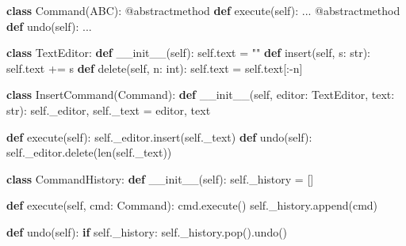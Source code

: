 \documentclass[11pt]{article}
\newenvironment{Shaded}{\begin{snugshade}}{\end{snugshade}}
\newcommand{\AttributeTok}[1]{\textcolor[rgb]{0.16,0.50,0.73}{#1}}
\newcommand{\BuiltInTok}[1]{\textcolor[rgb]{0.50,0.55,0.55}{#1}}
\newcommand{\ControlFlowTok}[1]{\textcolor[rgb]{0.99,0.74,0.29}{\textbf{#1}}}
\newcommand{\FunctionTok}[1]{\textcolor[rgb]{0.56,0.27,0.68}{#1}}
\newcommand{\KeywordTok}[1]{\textcolor[rgb]{0.81,0.81,0.76}{\textbf{#1}}}
\newcommand{\NormalTok}[1]{\textcolor[rgb]{0.81,0.81,0.76}{#1}}
\newcommand{\OperatorTok}[1]{\textcolor[rgb]{0.81,0.81,0.76}{#1}}
\newcommand{\StringTok}[1]{\textcolor[rgb]{0.96,0.31,0.31}{#1}}
\newcommand{\VariableTok}[1]{\textcolor[rgb]{0.15,0.68,0.68}{#1}}
\begin{document}
\begin{Shaded}
\begin{Highlighting}[]
\KeywordTok{class}\NormalTok{ Command(ABC):}
    \AttributeTok{@abstractmethod}
    \KeywordTok{def}\NormalTok{ execute(}\VariableTok{self}\NormalTok{): ...}
    \AttributeTok{@abstractmethod}
    \KeywordTok{def}\NormalTok{ undo(}\VariableTok{self}\NormalTok{): ...}

\KeywordTok{class}\NormalTok{ TextEditor:}
    \KeywordTok{def} \FunctionTok{\_\_init\_\_}\NormalTok{(}\VariableTok{self}\NormalTok{): }\VariableTok{self}\NormalTok{.text }\OperatorTok{=} \StringTok{""}
    \KeywordTok{def}\NormalTok{ insert(}\VariableTok{self}\NormalTok{, s: }\BuiltInTok{str}\NormalTok{): }\VariableTok{self}\NormalTok{.text }\OperatorTok{+=}\NormalTok{ s}
    \KeywordTok{def}\NormalTok{ delete(}\VariableTok{self}\NormalTok{, n: }\BuiltInTok{int}\NormalTok{): }\VariableTok{self}\NormalTok{.text }\OperatorTok{=} \VariableTok{self}\NormalTok{.text[:}\OperatorTok{{-}}\NormalTok{n]}

\KeywordTok{class}\NormalTok{ InsertCommand(Command):}
    \KeywordTok{def} \FunctionTok{\_\_init\_\_}\NormalTok{(}\VariableTok{self}\NormalTok{, editor: TextEditor, text: }\BuiltInTok{str}\NormalTok{):}
        \VariableTok{self}\NormalTok{.\_editor, }\VariableTok{self}\NormalTok{.\_text }\OperatorTok{=}\NormalTok{ editor, text}

    \KeywordTok{def}\NormalTok{ execute(}\VariableTok{self}\NormalTok{): }\VariableTok{self}\NormalTok{.\_editor.insert(}\VariableTok{self}\NormalTok{.\_text)}
    \KeywordTok{def}\NormalTok{ undo(}\VariableTok{self}\NormalTok{): }\VariableTok{self}\NormalTok{.\_editor.delete(}\BuiltInTok{len}\NormalTok{(}\VariableTok{self}\NormalTok{.\_text))}

\KeywordTok{class}\NormalTok{ CommandHistory:}
    \KeywordTok{def} \FunctionTok{\_\_init\_\_}\NormalTok{(}\VariableTok{self}\NormalTok{): }\VariableTok{self}\NormalTok{.\_history }\OperatorTok{=}\NormalTok{ []}

    \KeywordTok{def}\NormalTok{ execute(}\VariableTok{self}\NormalTok{, cmd: Command):}
\NormalTok{        cmd.execute()}
        \VariableTok{self}\NormalTok{.\_history.append(cmd)}

    \KeywordTok{def}\NormalTok{ undo(}\VariableTok{self}\NormalTok{):}
        \ControlFlowTok{if} \VariableTok{self}\NormalTok{.\_history:}
            \VariableTok{self}\NormalTok{.\_history.pop().undo()}
\end{Highlighting}
\end{Shaded}
\end{document}
